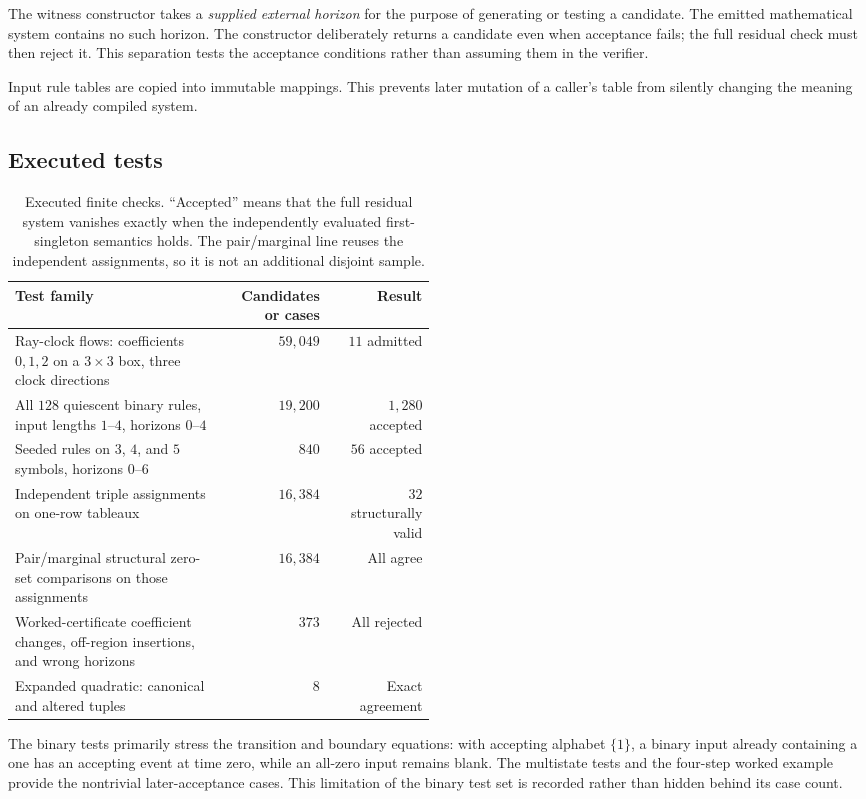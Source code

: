 \documentclass[11pt,letterpaper]{article}
\numberwithin{equation}{section}
\theoremstyle{definition}
\begin{document}
The witness constructor takes a \emph{supplied external horizon} for the
purpose of generating or testing a candidate. The emitted mathematical
system contains no such horizon. The constructor deliberately returns a
candidate even when acceptance fails; the full residual check must then
reject it. This separation tests the acceptance conditions rather than
assuming them in the verifier.

Input rule tables are copied into immutable mappings. This prevents later
mutation of a caller's table from silently changing the meaning of an
already compiled system.

\subsection{Executed tests}

\begin{table}[ht]
\centering\small
\begin{tabular}{@{}p{0.49\linewidth}rr@{}}
\toprule
Test family & Candidates or cases & Result\\
\midrule
Ray-clock flows: coefficients $0,1,2$ on a $3\times3$ box,
three clock directions & $59{,}049$ & $11$ admitted\\
All $128$ quiescent binary rules, input lengths $1$--$4$,
horizons $0$--$4$ & $19{,}200$ & $1{,}280$ accepted\\
Seeded rules on $3$, $4$, and $5$ symbols, horizons $0$--$6$
& $840$ & $56$ accepted\\
Independent triple assignments on one-row tableaux
& $16{,}384$ & $32$ structurally valid\\
Pair/marginal structural zero-set comparisons on those assignments
& $16{,}384$ & All agree\\
Worked-certificate coefficient changes, off-region insertions,
and wrong horizons & $373$ & All rejected\\
Expanded quadratic: canonical and altered tuples & $8$ & Exact agreement\\
\bottomrule
\end{tabular}
\caption{Executed finite checks. ``Accepted'' means that the full residual
system vanishes exactly when the independently evaluated first-singleton
semantics holds. The pair/marginal line reuses the independent assignments,
so it is not an additional disjoint sample.}
\label{pwh:uh:tab:tests}
\end{table}

The binary tests primarily stress the transition and boundary equations:
with accepting alphabet $\{1\}$, a binary input already containing a one
has an accepting event at time zero, while an all-zero input remains
blank. The multistate tests and the four-step worked example provide the
nontrivial later-acceptance cases. This limitation of the binary test set
is recorded rather than hidden behind its case count.
\end{document}

